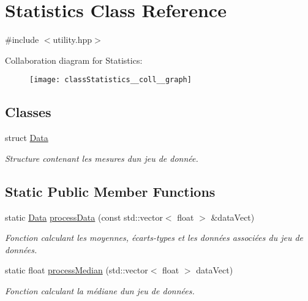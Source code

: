 \hypertarget{classStatistics}{}\section{Statistics Class Reference}
\label{classStatistics}


{\ttfamily \#include $<$utility.\+hpp$>$}



Collaboration diagram for Statistics\+:\nopagebreak
\begin{figure}[H]
\begin{center}
\leavevmode
\texttt{[image: classStatistics\_\_coll\_\_graph]}
\end{center}
\end{figure}
\subsection*{Classes}
\begin{DoxyCompactItemize}
\item 
struct \hyperlink{structStatistics_1_1Data}{Data}
\begin{DoxyCompactList}\small\item\em Structure contenant les mesures d\textquotesingle{}un jeu de donnée. \end{DoxyCompactList}\end{DoxyCompactItemize}
\subsection*{Static Public Member Functions}
\begin{DoxyCompactItemize}
\item 
static \hyperlink{structStatistics_1_1Data}{Data} \hyperlink{classStatistics_aaa2152a3f262ce8d003663f993420c4c}{process\+Data} (const std\+::vector$<$ float $>$ \&data\+Vect)
\begin{DoxyCompactList}\small\item\em Fonction calculant les moyennes, écarts-\/types et les données associées du jeu de données. \end{DoxyCompactList}\item 
static float \hyperlink{classStatistics_ae1c12077162711aa0ea8b4ee6e15b4da}{process\+Median} (std\+::vector$<$ float $>$ data\+Vect)
\begin{DoxyCompactList}\small\item\em Fonction calculant la médiane d\textquotesingle{}un jeu de données. \end{DoxyCompactList}\end{DoxyCompactItemize}


